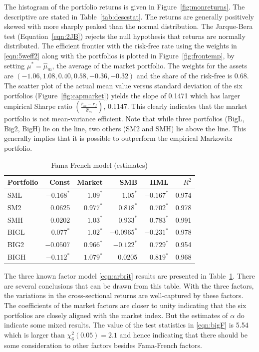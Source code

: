 The histogram of the portfolio returns is given in Figure~\ref{fig:monreturns}. The descriptive are stated in Table~\ref{tab:descstat}. The returns are generally positively skewed with more sharply peaked than the normal distribution. The Jarque-Bera test (Equation~\ref{eqn:2JB}) rejects the null hypothesis that returns are normally distributed. The efficient frontier with the risk-free rate using the weights in \eqref{eqn:5weff2} along with the portfolios is plotted in Figure~\ref{fig:frontemp}, by setting $\mu^*= \hat{\mu}_m$, the average of the market portfolio. The weights for the assets are $(-1.06, 1.08, 0.40, 0.58, -0.36, -0.32)$ and the share of the risk-free is 0.68. The scatter plot of the actual mean value versus standard deviation of the six portfolios (Figure~\ref{fig:capmarket}) yields the slope of 0.1471 which has larger empirical Sharpe ratio $\left( \frac{\overline{r}_m - r_f}{\hat{\sigma}_m} \right)$, 0.1147. This clearly indicates that the market portfolio is not mean-variance efficient. Note that while three portfolios (BigL, Big2, BigH) lie on the line, two others (SM2 and SMH) lie above the line. This generally implies that it is possible to outperform the empirical Markowitz portfolio. 

        \begin{table}
        \centering
        \caption{Fama French model (estimates)\label{tab:famafrenchmodel}}
        \begin{tabular}{lrrrrr}
        Portfolio & Const & Market & SMB & HML & $R^2$ \\ \hline
        SML & $-0.168^*$ & $1.09^*$ & $1.05^*$ & $-0.167^*$ & 0.974 \\
        SM2 & 0.0625 & $0.977^*$ & $0.818^*$ & $0.702^*$ & 0.978 \\
        SMH & 0.0202 & $1.03^*$ & $0.933^*$ & $0.783^*$ & 0.991 \\
        BIGL & $0.077^*$ & $1.02^*$ & $-0.0965^*$ & $-0.231^*$ & 0.978 \\
        BIG2 & $-0.0507$ & $0.966^*$ & $-0.122^*$ & $0.729^*$ & 0.954 \\
        BIGH & $-0.112^*$ & $1.079^*$ & 0.0205 & $0.819^*$ & 0.968
        \end{tabular}
        \end{table}


The three known factor model \eqref{eqn:arbrit} results are presented in Table~\ref{tab:famafrenchmodel}. There are several conclusions that can be drawn from this table. With the three factors, the variations in the cross-sectional returns are well-captured by these factors. The coefficients of the market factors are closer to unity indicating that the six portfolios are closely aligned with the market index. But the estimates of $\alpha$ do indicate some mixed results. The value of the test statistics in \eqref{eqn:bigF} is 5.54 which is larger than $\chi_6^2 (0.05)= 2.1$ and hence indicating that there should be some consideration to other factors besides Fama-French factors.


